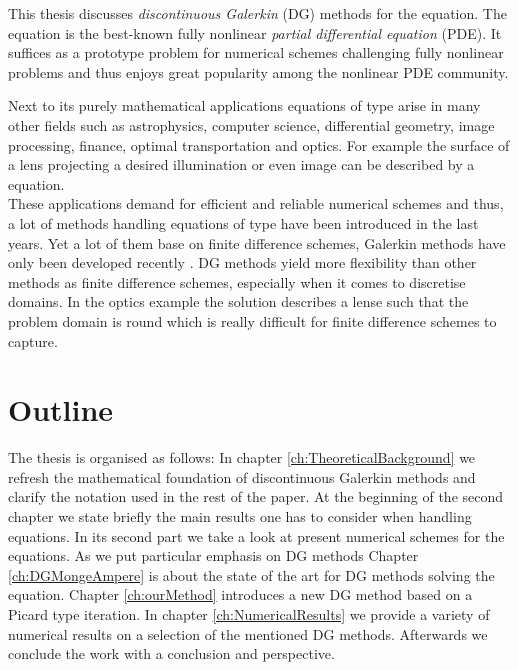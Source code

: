 This thesis discusses \emph{discontinuous Galerkin} (DG) methods for the \MA equation. 
The \MA equation is the best-known fully nonlinear \emph{partial differential equation} (PDE). It suffices as a prototype problem for numerical schemes challenging fully nonlinear problems and thus enjoys great popularity among the nonlinear PDE community.

Next to its purely mathematical applications equations of \MA type arise in many other fields such as astrophysics, computer science, differential geometry, image processing, finance, optimal transportation and optics\cite{FGN2013}. 
For example the surface of a lens projecting a desired illumination or even image can be described by a \MA equation\cite{KW2010, BHP2014}. \\
These applications demand for efficient and reliable numerical schemes and thus, a lot of methods handling equations of \MA type have been introduced in the last years. Yet a lot of them base on finite difference schemes, Galerkin methods have only been developed recently \cite{Boehmer2008, FN2009a, Awanou2010, BGN+2011, Neilan2014}. DG methods yield more flexibility than other methods as finite difference schemes, especially when it comes to discretise domains. In the optics example the solution describes a lense such that the problem domain is round which is really difficult for finite difference schemes to capture.

\section*{Outline}
The thesis is organised as follows: In chapter \ref{ch:TheoreticalBackground} we refresh the mathematical foundation of discontinuous Galerkin methods and clarify the notation used in the rest of the paper.
At the beginning of the second chapter we state briefly the main results one has to consider when handling \MA equations. In its second part we take a look at present numerical schemes for the \MA equations. As we put particular emphasis on DG methods Chapter \ref{ch:DGMongeAmpere} is about the state of the art for DG methods solving the \MA equation.
Chapter \ref{ch:ourMethod} introduces a new DG method based on a Picard type iteration. In chapter \ref{ch:NumericalResults} we provide a variety of numerical results on a selection of the mentioned DG methods.
Afterwards we conclude the work with a conclusion and perspective.